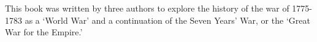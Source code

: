 This book was written by three authors to explore the history of the war of 1775-1783 as a `World War' and a continuation of the Seven Years' War, or the `Great War for the Empire.' 
